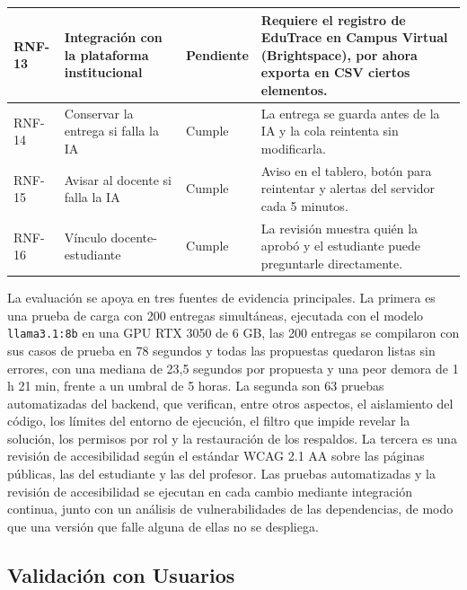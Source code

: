 \documentclass[letterpaper, 10 pt, conference]{ieeeconf}
\begin{document}
\begin{table}[t]
\begin{tabular}{|p{1.2cm}|p{4.6cm}|p{2.2cm}|p{8.2cm}|}
RNF-13 & Integración con la plataforma institucional & Pendiente & Requiere el registro de EduTrace en Campus Virtual (Brightspace), por ahora exporta en CSV ciertos elementos. \\ \hline
RNF-14 & Conservar la entrega si falla la IA & Cumple & La entrega se guarda antes de la IA y la cola reintenta sin modificarla. \\ \hline
RNF-15 & Avisar al docente si falla la IA & Cumple & Aviso en el tablero, botón para reintentar y alertas del servidor cada 5 minutos. \\ \hline
RNF-16 & Vínculo docente-estudiante & Cumple & La revisión muestra quién la aprobó y el estudiante puede preguntarle directamente. \\ \hline
\end{tabular}
\end{table}

La evaluación se apoya en tres fuentes de evidencia principales.
La primera es una prueba de carga con 200 entregas simultáneas, ejecutada con el modelo \texttt{llama3.1:8b} en una GPU RTX 3050 de 6 GB, las 200 entregas se compilaron con sus casos de prueba en 78 segundos y todas las propuestas quedaron listas sin errores, con una mediana de 23,5 segundos por propuesta y una peor demora de 1 h 21 min, frente a un umbral de 5 horas.
La segunda son 63 pruebas automatizadas del backend, que verifican, entre otros aspectos, el aislamiento del código, los límites del entorno de ejecución, el filtro que impide revelar la solución, los permisos por rol y la restauración de los respaldos.
La tercera es una revisión de accesibilidad según el estándar WCAG 2.1 AA sobre las páginas públicas, las del estudiante y las del profesor.
Las pruebas automatizadas y la revisión de accesibilidad se ejecutan en cada cambio mediante integración continua, junto con un análisis de vulnerabilidades de las dependencias, de modo que una versión que falle alguna de ellas no se despliega.

\subsection{Validación con Usuarios}
\end{document}
